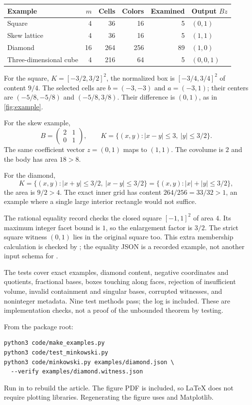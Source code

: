 \begin{center}
\begin{tabular}{lrrrrl}
\toprule
Example & \(m\) & Cells & Colors & Examined & Output \(Bz\)\\
\midrule
Square &4&36&16&5&\((0,1)\)\\
Skew lattice &4&36&16&5&\((1,1)\)\\
Diamond &16&264&256&89&\((1,0)\)\\
Three-dimensional cube &4&216&64&5&\((0,0,1)\)\\
\bottomrule
\end{tabular}
\end{center}

For the square, \(K=[-3/2,3/2]^2\), the normalized
box is \([-3/4,3/4]^2\) of content \(9/4\).
The selected cells are \(b=(-3,-3)\) and \(a=(-3,1)\);
their centers are \((-5/8,-5/8)\) and \((-5/8,3/8)\).
Their difference is \((0,1)\), as in
\cref{fig:example}.

For the skew example,
\[
 B=\begin{pmatrix}2&1\\0&1\end{pmatrix},\qquad
 K=\{(x,y):|x-y|\leq3,\ |y|\leq3/2\}.
\]
The same coefficient vector \(z=(0,1)\) maps to
\((1,1)\). The covolume is \(2\) and the body
has area \(18>8\).

For the diamond,
\[
 K=\{(x,y):|x+y|\leq3/2,\ |x-y|\leq3/2\}
   =\{(x,y):|x|+|y|\leq3/2\},
\]
the area is \(9/2>4\). The exact inner grid has
content \(264/256=33/32>1\), an example where a
single large interior rectangle would not suffice.

The rational equality record checks the closed
square \([-1,1]^2\) of area \(4\). Its maximum
integer facet bound is \(1\), so the enlargement
factor is \(3/2\). The strict square witness
\((0,1)\) lies in the original square too.
This extra membership calculation is checked by
; the equality JSON is
a recorded example, not another input schema for
.

The tests cover exact examples, diamond content,
negative coordinates and quotients, fractional
bases, boxes touching along faces, rejection of
insufficient volume, invalid containment and
singular bases, corrupted witnesses, and
noninteger metadata. Nine test methods pass;
the log is included. These are implementation
checks, not a proof of the unbounded theorem by
testing.

From the package root:
\begin{lstlisting}
python3 code/make_examples.py
python3 code/test_minkowski.py
python3 code/minkowski.py examples/diamond.json \
  --verify examples/diamond.witness.json
\end{lstlisting}
Run  in  to rebuild the
article. The figure PDF is included, so LaTeX
does not require plotting libraries.
Regenerating the figure uses
 and Matplotlib.
